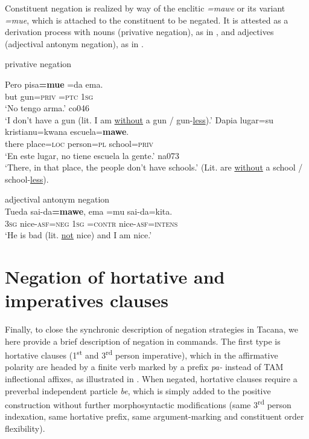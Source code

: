 \documentclass[output=paper]{langsci/langscibook}
\begin{document}
Constituent negation is realized by way of the enclitic
\textit{=mawe} or its variant \textit{=mue}, which is attached to the
constituent to be negated. It is attested as a derivation process with
nouns (privative negation), as in , and adjectives
(adjectival antonym negation), as in .

\begin{exe}\ex\label{ex:tacana-privative} privative negation
\begin{xlist}
\ex
\gll Pero pisa\textbf{=mue} =da ema.\\
    but gun=\textsc{priv} \textsc{=ptc} \textsc{1sg}\\
\glt `No tengo arma.' co046\\
`I don't have a gun (lit. I am \uline{without} a gun \slash{}
gun-\uline{less}).'
\ex
\gll Dapia lugar=su kristianu=kwana escuela=\textbf{mawe}.\\
there place=\textsc{loc} person=\textsc{pl} school=\textsc{priv}\\
\glt `En este lugar, no tiene escuela la gente.' na073\\
`There, in that place, the people don't have schools.' (Lit. are
\uline{without} a school \slash{} school-\uline{less}).
\end{xlist}
\ex\label{ex:tacana-antonym} adjectival antonym negation\\
\gll {}Tueda sai-da\textbf{=mawe}, ema =mu sai-da=kita.\\
3\textsc{sg} nice-\textsc{asf=neg} \textsc{1sg} \textsc{=contr}
nice-\textsc{asf=intens}\\
\glt `He is bad (lit. \uline{not} nice) and I am nice.'\\
\end{exe}

\section{Negation of hortative and imperatives clauses}\label{sec:tacana-8}

Finally, to close the synchronic description of negation strategies in
Tacana, we here provide a brief description of negation in commands.
The first type is hortative clauses (1\textsuperscript{st} and
3\textsuperscript{rd} person imperative), which in the affirmative polarity
are headed by a finite verb marked by a prefix \textit{pa-} instead of TAM
inflectional affixes, as illustrated in .
When negated, hortative clauses require a preverbal independent
particle \textit{be}, which is simply added to the positive construction
without further morphosyntactic modifications (same 3\textsuperscript{rd}
person indexation, same hortative prefix, same argument-marking and constituent order flexibility).
\end{document}
